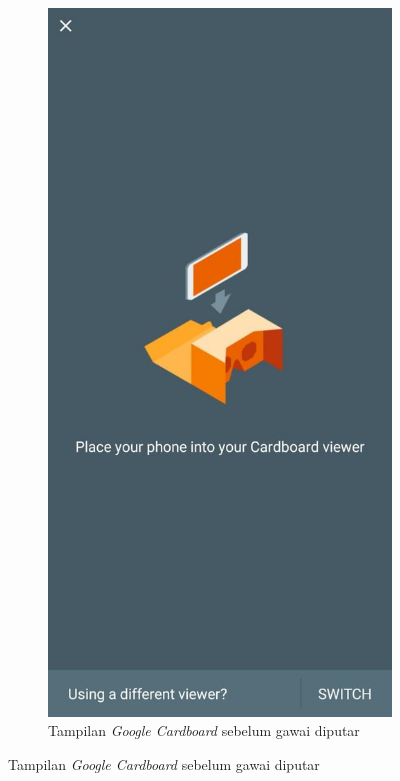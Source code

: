 \begin{figure}[!hp]
  \hfill
  \begin{subfigure}[b]{0.3\textwidth}
    \includegraphics[width=\textwidth]{Gambar/cardboard-page.png}
    \caption{Tampilan \textit{Google Cardboard} sebelum gawai diputar}
    \label{fig:cardboard-page}
  \end{subfigure}
\end{figure}


